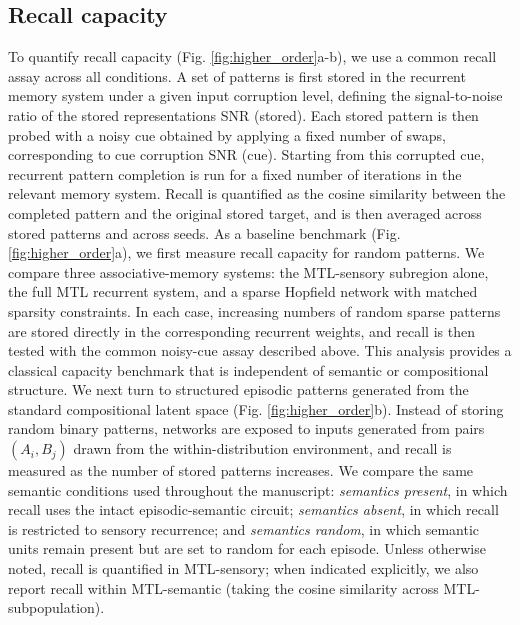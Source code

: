 \documentclass{article}
\begin{document}
\subsection*{Recall capacity}
To quantify recall capacity (Fig. \ref{fig:higher_order}a-b), we use a common recall assay across all conditions. A set of patterns is first stored in the recurrent memory system under a given input corruption level, defining the signal-to-noise ratio of the stored representations SNR (stored). Each stored pattern is then probed with a noisy cue obtained by applying a fixed number of swaps, corresponding to cue corruption SNR (cue). Starting from this corrupted cue, recurrent pattern completion is run for a fixed number of iterations in the relevant memory system. Recall is quantified as the cosine similarity between the completed pattern and the original stored target, and is then averaged across stored patterns and across seeds.
\newline\newline
As a baseline benchmark (Fig. \ref{fig:higher_order}a), we first measure recall capacity for random patterns. We compare three associative-memory systems: the MTL-sensory subregion alone, the full MTL recurrent system, and a sparse Hopfield network with matched sparsity constraints. In each case, increasing numbers of random sparse patterns are stored directly in the corresponding recurrent weights, and recall is then tested with the common noisy-cue assay described above. This analysis provides a classical capacity benchmark that is independent of semantic or compositional structure.
\newline\newline
We next turn to structured episodic patterns generated from the standard compositional latent space (Fig. \ref{fig:higher_order}b). Instead of storing random binary patterns, networks are exposed to inputs generated from pairs $(A_i,B_j)$ drawn from the within-distribution environment, and recall is measured as the number of stored patterns increases. We compare the same semantic conditions used throughout the manuscript: \emph{semantics present}, in which recall uses the intact episodic-semantic circuit; \emph{semantics absent}, in which recall is restricted to sensory recurrence; and \emph{semantics random}, in which semantic units remain present but are set to random for each episode. Unless otherwise noted, recall is quantified in MTL-sensory; when indicated explicitly, we also report recall within MTL-semantic (taking the cosine similarity across MTL-subpopulation).
\end{document}
